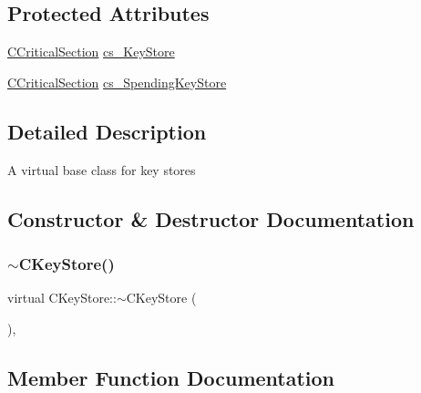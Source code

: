 \subsection*{Protected Attributes}
\begin{DoxyCompactItemize}
\item 
\mbox{\hyperlink{sync_8h_a37a4692b2d517f2843655ca11af7668a}{C\+Critical\+Section}} \mbox{\hyperlink{class_c_key_store_a386524ff4a00959b81c195cb39fe307d}{cs\+\_\+\+Key\+Store}}
\item 
\mbox{\hyperlink{sync_8h_a37a4692b2d517f2843655ca11af7668a}{C\+Critical\+Section}} \mbox{\hyperlink{class_c_key_store_ac81106dc4a3f71d6c1781bfd10fb6589}{cs\+\_\+\+Spending\+Key\+Store}}
\end{DoxyCompactItemize}


\subsection{Detailed Description}
A virtual base class for key stores 

\subsection{Constructor \& Destructor Documentation}
\mbox{\label{class_c_key_store_a9bfaef2bcd6effc467a96043f44044a0}} 
\subsubsection{\texorpdfstring{$\sim$\+C\+Key\+Store()}{~CKeyStore()}}
{\footnotesize\ttfamily virtual C\+Key\+Store\+::$\sim$\+C\+Key\+Store (\begin{DoxyParamCaption}{ }\end{DoxyParamCaption})\hspace{0.3cm}{\ttfamily [inline]}, {\ttfamily [virtual]}}



\subsection{Member Function Documentation}
\mbox{\label{class_c_key_store_a2fb2e02e8cdc364607efd5ebb14b8064}} 
